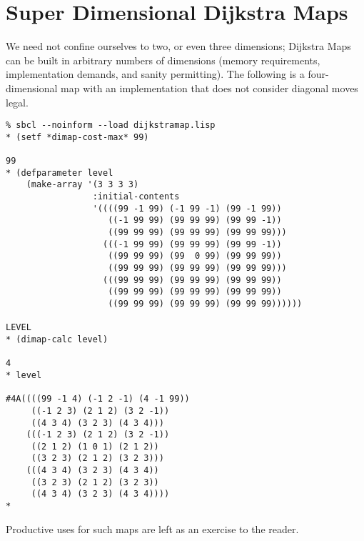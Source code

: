 \documentclass[12pt,a4paper]{article}
\begin{document}
\section*{Super Dimensional Dijkstra Maps}

We need not confine ourselves to two, or even three dimensions;
Dijkstra Maps can be built in arbitrary numbers of dimensions
(memory requirements, implementation demands, and sanity
permitting). The following is a four-dimensional map with an
implementation\cite{crazylisp} that does not consider diagonal
moves legal.

\begin{verbatim}
% sbcl --noinform --load dijkstramap.lisp
* (setf *dimap-cost-max* 99)

99
* (defparameter level
    (make-array '(3 3 3 3)
                 :initial-contents
                 '((((99 -1 99) (-1 99 -1) (99 -1 99))
                    ((-1 99 99) (99 99 99) (99 99 -1))
                    ((99 99 99) (99 99 99) (99 99 99)))
                   (((-1 99 99) (99 99 99) (99 99 -1))
                    ((99 99 99) (99  0 99) (99 99 99))
                    ((99 99 99) (99 99 99) (99 99 99)))
                   (((99 99 99) (99 99 99) (99 99 99))
                    ((99 99 99) (99 99 99) (99 99 99))
                    ((99 99 99) (99 99 99) (99 99 99))))))

LEVEL
* (dimap-calc level)

4
* level

#4A((((99 -1 4) (-1 2 -1) (4 -1 99))
     ((-1 2 3) (2 1 2) (3 2 -1))
     ((4 3 4) (3 2 3) (4 3 4)))
    (((-1 2 3) (2 1 2) (3 2 -1))
     ((2 1 2) (1 0 1) (2 1 2))
     ((3 2 3) (2 1 2) (3 2 3)))
    (((4 3 4) (3 2 3) (4 3 4))
     ((3 2 3) (2 1 2) (3 2 3))
     ((4 3 4) (3 2 3) (4 3 4))))
*
\end{verbatim}

Productive uses for such maps are left as an exercise to the reader.

\clearpage

\end{document}
